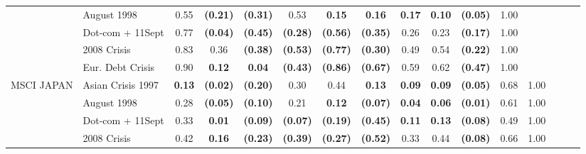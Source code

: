 \documentclass[12pt]{article}
\begin{document}
\begin{table}[H]
{\begin{tabular}{@{}llcccccccccccccc@{}}
                  & August 1998       & 0.55            & \textbf{(0.21)} & \textbf{(0.31)} & 0.53            & \textbf{0.15}   & \textbf{0.16}   & \textbf{0.17}   & \textbf{0.10}   & \textbf{(0.05)} & 1.00            &                 &                 &                 &                 \\
                  & Dot-com + 11Sept  & 0.77            & \textbf{(0.04)} & \textbf{(0.45)} & \textbf{(0.28)} & \textbf{(0.56)} & \textbf{(0.35)} & 0.26            & 0.23            & \textbf{(0.17)} & 1.00            &                 &                 &                 &                 \\
                  & 2008 Crisis       & 0.83            & 0.36            & \textbf{(0.38)} & \textbf{(0.53)} & \textbf{(0.77)} & \textbf{(0.30)} & 0.49            & 0.54            & \textbf{(0.22)} & 1.00            &                 &                 &                 &                 \\
                  & Eur. Debt Crisis  & 0.90            & \textbf{0.12}   & \textbf{0.04}   & \textbf{(0.43)} & \textbf{(0.86)} & \textbf{(0.67)} & 0.59            & 0.62            & \textbf{(0.47)} & 1.00            &                 &                 &                 &                 \\
MSCI JAPAN        & Asian Crisis 1997 & \textbf{0.13}   & \textbf{(0.02)} & \textbf{(0.20)} & 0.30            & 0.44            & \textbf{0.13}   & \textbf{0.09}   & \textbf{0.09}   & \textbf{(0.05)} & 0.68            & 1.00            &                 &                 &                 \\
                  & August 1998       & 0.28            & \textbf{(0.05)} & \textbf{(0.10)} & 0.21            & \textbf{0.12}   & \textbf{(0.07)} & \textbf{0.04}   & \textbf{0.06}   & \textbf{(0.01)} & 0.61            & 1.00            &                 &                 &                 \\
                  & Dot-com + 11Sept  & 0.33            & \textbf{0.01}   & \textbf{(0.09)} & \textbf{(0.07)} & \textbf{(0.19)} & \textbf{(0.45)} & \textbf{0.11}   & \textbf{0.13}   & \textbf{(0.08)} & 0.49            & 1.00            &                 &                 &                 \\
                  & 2008 Crisis       & 0.42            & \textbf{0.16}   & \textbf{(0.23)} & \textbf{(0.39)} & \textbf{(0.27)} & \textbf{(0.52)} & 0.33            & 0.44            & \textbf{(0.08)} & 0.66            & 1.00            &                 &                 &                 \\

\end{tabular}}
\end{table}
\end{document}
